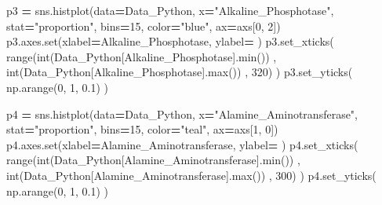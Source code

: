 \documentclass[
  11pt,
  a4paper,
]{article}
\newenvironment{Shaded}{\begin{snugshade}}{\end{snugshade}}
\newcommand{\BuiltInTok}[1]{#1}
\newcommand{\DecValTok}[1]{\textcolor[rgb]{0.00,0.00,0.81}{#1}}
\newcommand{\FloatTok}[1]{\textcolor[rgb]{0.00,0.00,0.81}{#1}}
\newcommand{\NormalTok}[1]{#1}
\newcommand{\OperatorTok}[1]{\textcolor[rgb]{0.81,0.36,0.00}{\textbf{#1}}}
\newcommand{\StringTok}[1]{\textcolor[rgb]{0.31,0.60,0.02}{#1}}
\begin{document}
\begin{Shaded}
\begin{Highlighting}[]
\NormalTok{p3 }\OperatorTok{=}\NormalTok{ sns.histplot(data}\OperatorTok{=}\NormalTok{Data\_Python, x}\OperatorTok{=}\StringTok{"Alkaline\_Phosphotase"}\NormalTok{, stat}\OperatorTok{=}\StringTok{"proportion"}\NormalTok{, bins}\OperatorTok{=}\DecValTok{15}\NormalTok{, color}\OperatorTok{=}\StringTok{"blue"}\NormalTok{, ax}\OperatorTok{=}\NormalTok{axs[}\DecValTok{0}\NormalTok{, }\DecValTok{2}\NormalTok{])}
\NormalTok{p3.axes.}\BuiltInTok{set}\NormalTok{(xlabel}\OperatorTok{=}\StringTok{\textquotesingle{}Alkaline\_Phosphotase\textquotesingle{}}\NormalTok{, ylabel}\OperatorTok{=}\StringTok{\textquotesingle{} \textquotesingle{}}\NormalTok{)}
\NormalTok{p3.set\_xticks( }\BuiltInTok{range}\NormalTok{(}\BuiltInTok{int}\NormalTok{(Data\_Python[}\StringTok{\textquotesingle{}Alkaline\_Phosphotase\textquotesingle{}}\NormalTok{].}\BuiltInTok{min}\NormalTok{()) , }\BuiltInTok{int}\NormalTok{(Data\_Python[}\StringTok{\textquotesingle{}Alkaline\_Phosphotase\textquotesingle{}}\NormalTok{].}\BuiltInTok{max}\NormalTok{()) , }\DecValTok{320}\NormalTok{) )}
\NormalTok{p3.set\_yticks( np.arange(}\DecValTok{0}\NormalTok{, }\DecValTok{1}\NormalTok{, }\FloatTok{0.1}\NormalTok{)  )}

\NormalTok{p4 }\OperatorTok{=}\NormalTok{ sns.histplot(data}\OperatorTok{=}\NormalTok{Data\_Python, x}\OperatorTok{=}\StringTok{"Alamine\_Aminotransferase"}\NormalTok{, stat}\OperatorTok{=}\StringTok{"proportion"}\NormalTok{, bins}\OperatorTok{=}\DecValTok{15}\NormalTok{, color}\OperatorTok{=}\StringTok{"teal"}\NormalTok{, ax}\OperatorTok{=}\NormalTok{axs[}\DecValTok{1}\NormalTok{, }\DecValTok{0}\NormalTok{])}
\NormalTok{p4.axes.}\BuiltInTok{set}\NormalTok{(xlabel}\OperatorTok{=}\StringTok{\textquotesingle{}Alamine\_Aminotransferase\textquotesingle{}}\NormalTok{, ylabel}\OperatorTok{=}\StringTok{\textquotesingle{} \textquotesingle{}}\NormalTok{)}
\NormalTok{p4.set\_xticks( }\BuiltInTok{range}\NormalTok{(}\BuiltInTok{int}\NormalTok{(Data\_Python[}\StringTok{\textquotesingle{}Alamine\_Aminotransferase\textquotesingle{}}\NormalTok{].}\BuiltInTok{min}\NormalTok{()) , }\BuiltInTok{int}\NormalTok{(Data\_Python[}\StringTok{\textquotesingle{}Alamine\_Aminotransferase\textquotesingle{}}\NormalTok{].}\BuiltInTok{max}\NormalTok{()) , }\DecValTok{300}\NormalTok{) )}
\NormalTok{p4.set\_yticks( np.arange(}\DecValTok{0}\NormalTok{, }\DecValTok{1}\NormalTok{, }\FloatTok{0.1}\NormalTok{)  )}


\end{Highlighting}
\end{Shaded}
\end{document}
